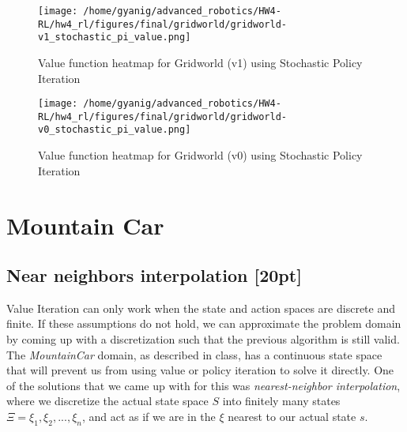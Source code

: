 \documentclass{article}
\begin{document}
\begin{figure}[h]
    \centering
    \begin{minipage}[t]{0.45\textwidth}
        \centering
        \texttt{[image: /home/gyanig/advanced\_robotics/HW4-RL/hw4\_rl/figures/final/gridworld/gridworld-v1\_stochastic\_pi\_value.png]}
        \caption{Value function heatmap for Gridworld (v1) using Stochastic Policy Iteration}
        \label{fig:gridworld_v1_stoch_pi}
    \end{minipage}
    \hfill
    \begin{minipage}[t]{0.45\textwidth}
        \centering
        \texttt{[image: /home/gyanig/advanced\_robotics/HW4-RL/hw4\_rl/figures/final/gridworld/gridworld-v0\_stochastic\_pi\_value.png]}
        \caption{Value function heatmap for Gridworld (v0) using Stochastic Policy Iteration}
        \label{fig:gridworld_v0_stoch_pi}
    \end{minipage}
\end{figure}
\newpage 
\section{Mountain Car}
\subsection{Near neighbors interpolation [20pt]}

Value Iteration can only work when the state and action spaces are discrete and finite. If these assumptions do not hold, we can approximate the problem domain by coming up with a discretization such that the previous algorithm is still valid. The \textit{MountainCar} domain, as described in class, has a continuous state space that will prevent us from using value or policy iteration to solve it directly. One of the solutions that we came up with for this was \emph{nearest-neighbor interpolation}, where we discretize the actual state space $S$ into finitely many states $\Xi={\xi_1, \xi_2,...,\xi_n}$, and act as if we are in the $\xi$ nearest to our actual state $s$.
\end{document}
